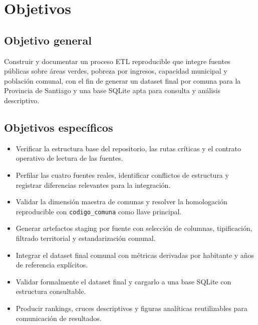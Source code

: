 \chapter{Objetivos}

\section{Objetivo general}

Construir y documentar un proceso ETL reproducible que integre fuentes públicas sobre áreas verdes, pobreza por ingresos, capacidad municipal y población comunal, con el fin de generar un dataset final por comuna para la Provincia de Santiago y una base SQLite apta para consulta y análisis descriptivo.

\section{Objetivos específicos}

\begin{itemize}
\item Verificar la estructura base del repositorio, las rutas críticas y el contrato operativo de lectura de las fuentes.
\item Perfilar las cuatro fuentes reales, identificar conflictos de estructura y registrar diferencias relevantes para la integración.
\item Validar la dimensión maestra de comunas y resolver la homologación reproducible con \texttt{codigo\_comuna} como llave principal.
\item Generar artefactos staging por fuente con selección de columnas, tipificación, filtrado territorial y estandarización comunal.
\item Integrar el dataset final comunal con métricas derivadas por habitante y años de referencia explícitos.
\item Validar formalmente el dataset final y cargarlo a una base SQLite con estructura consultable.
\item Producir rankings, cruces descriptivos y figuras analíticas reutilizables para comunicación de resultados.
\end{itemize}
